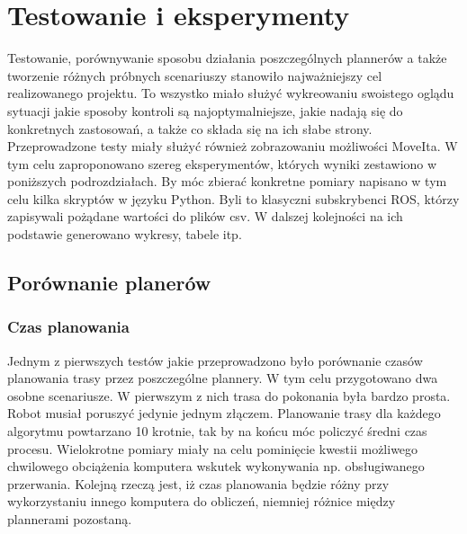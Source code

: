 \chapter{Testowanie i eksperymenty}

Testowanie, porównywanie sposobu działania poszczególnych plannerów a także tworzenie różnych próbnych scenariuszy stanowiło najważniejszy cel realizowanego projektu. To wszystko miało służyć wykreowaniu swoistego oglądu sytuacji jakie sposoby kontroli są najoptymalniejsze, jakie nadają się do konkretnych zastosowań, a także co składa się na ich słabe strony. Przeprowadzone testy miały służyć również zobrazowaniu możliwości MoveIta. W tym celu zaproponowano szereg eksperymentów, których wyniki zestawiono w poniższych podrozdziałach. By móc zbierać konkretne pomiary napisano w tym celu kilka skryptów w języku Python. Byli to klasyczni subskrybenci ROS, którzy zapisywali pożądane wartości do plików csv. W dalszej kolejności na ich podstawie generowano wykresy, tabele itp.

\section{Porównanie planerów}

\subsection{Czas planowania}
Jednym z pierwszych testów jakie przeprowadzono było porównanie czasów planowania trasy przez poszczególne plannery. W tym celu przygotowano dwa osobne scenariusze. W pierwszym z nich trasa do pokonania była bardzo prosta. Robot musiał poruszyć jedynie jednym złączem. Planowanie trasy dla każdego algorytmu powtarzano 10 krotnie, tak by na końcu móc policzyć średni czas procesu. Wielokrotne pomiary miały na celu pominięcie kwestii możliwego chwilowego obciążenia komputera wskutek wykonywania np. obsługiwanego przerwania. Kolejną rzeczą jest, iż czas planowania będzie różny przy wykorzystaniu innego komputera do obliczeń, niemniej różnice między plannerami pozostaną.

